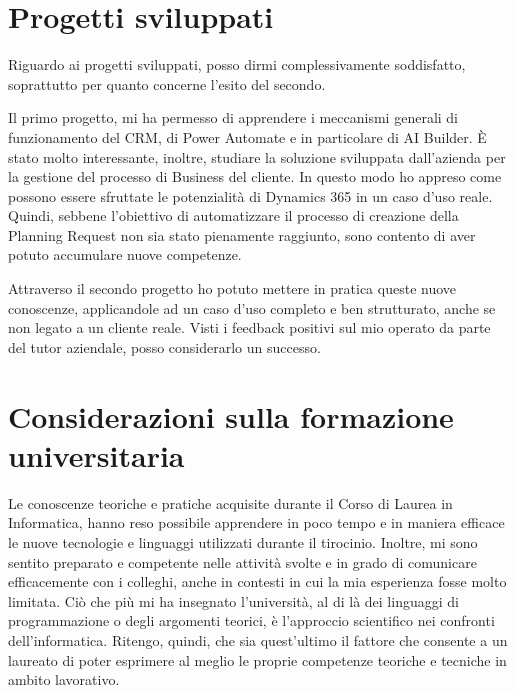 \section{Progetti sviluppati}
Riguardo ai progetti sviluppati, posso dirmi complessivamente soddisfatto, soprattutto per quanto concerne l'esito del secondo. 

Il primo progetto, mi ha permesso di apprendere i meccanismi generali di funzionamento del CRM, di Power Automate e in particolare di AI Builder. È stato molto interessante, inoltre, studiare la soluzione sviluppata dall'azienda per la gestione del processo di Business del cliente. In questo modo ho appreso come possono essere sfruttate le potenzialità di Dynamics 365 in un caso d'uso reale.
Quindi, sebbene l'obiettivo di automatizzare il processo di creazione della Planning Request non sia stato pienamente raggiunto, sono contento di aver potuto accumulare nuove competenze.

Attraverso il secondo progetto ho potuto mettere in pratica queste nuove conoscenze, applicandole ad un caso d'uso completo e ben strutturato, anche se non legato a un cliente reale. Visti i feedback positivi sul mio operato da parte del tutor aziendale, posso considerarlo un successo.

\section{Considerazioni sulla formazione universitaria}
Le conoscenze teoriche e pratiche acquisite durante il Corso di Laurea in Informatica, hanno reso possibile apprendere in poco tempo e in maniera efficace le nuove tecnologie e linguaggi utilizzati durante il tirocinio. Inoltre, mi sono sentito preparato e competente nelle attività svolte e in grado di comunicare efficacemente con i colleghi, anche in contesti in cui la mia esperienza fosse molto limitata. 
Ciò che più mi ha insegnato l'università, al di là dei linguaggi di programmazione o degli argomenti teorici, è l'approccio scientifico nei confronti dell'informatica. Ritengo, quindi, che sia quest'ultimo il fattore che consente a un laureato di poter esprimere al meglio le proprie competenze teoriche e tecniche in ambito lavorativo.
